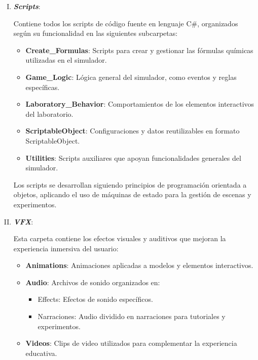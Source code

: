 \begin{enumerate} [I. ]
    Esta carpeta contiene todas las escenas creadas para el simulador
    \begin{itemize}
        \item \textbf{Experimentos}: Cada experimento tiene su propia escena, diseñada específicamente para simular procedimientos y reacciones químicas.
        \item \textbf{Tutorial}: Provee instrucciones guiadas para familiarizar al usuario con el simulador y las actividades.
        \item \textbf{Hub}: Actúa como un menú principal donde el usuario puede navegar hacia diferentes experimentos o tutoriales.
    \end{itemize}

    \item \textit{\textbf{Scripts}}:
    
    Contiene todos los scripts de código fuente en lenguaje C\#, organizados según su funcionalidad en las siguientes subcarpetas:
    \begin{itemize}
        \item \textbf{Create\_Formulas}: Scripts para crear y gestionar las fórmulas químicas utilizadas en el simulador.
        \item \textbf{Game\_Logic}: Lógica general del simulador, como eventos y reglas específicas.
        \item \textbf{Laboratory\_Behavior}: Comportamientos de los elementos interactivos del laboratorio.
        \item \textbf{ScriptableObject}: Configuraciones y datos reutilizables en formato ScriptableObject.
        \item \textbf{Utilities}: Scripts auxiliares que apoyan funcionalidades generales del simulador.
    \end{itemize}
    Los scripts se desarrollan siguiendo principios de programación orientada a objetos, aplicando el uso de máquinas de estado para la gestión de escenas y experimentos.

    \item \textit{\textbf{VFX}}:
    
    Esta carpeta contiene los efectos visuales y auditivos que mejoran la experiencia inmersiva del usuario:
    \begin{itemize}
        \item \textbf{Animations}: Animaciones aplicadas a modelos y elementos interactivos.
        \item \textbf{Audio}: Archivos de sonido organizados en:
        \begin{itemize}
            \item Effects: Efectos de sonido específicos.
            \item Narraciones: Audio dividido en narraciones para tutoriales y experimentos.
        \end{itemize}
        \item \textbf{Videos}: Clips de video utilizados para complementar la experiencia educativa.
    \end{itemize}    
\end{enumerate}

